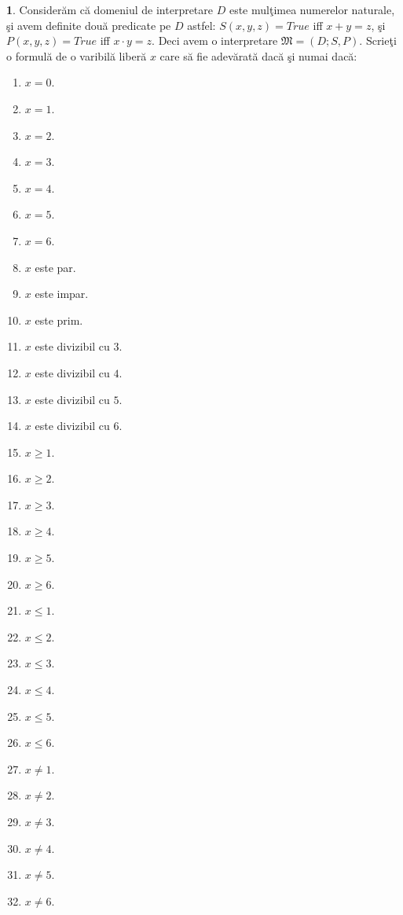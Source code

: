 \documentclass{article}
\begin{document}
{\bf 1}. Consider\u{a}m c\u{a} domeniul de interpretare $D$ este mul\c{t}imea numerelor naturale, \c{s}i avem definite dou\u{a} predicate pe $D$ astfel: 
$S(x,y,z)=True$ iff $x+y=z$, \c{s}i $P(x,y,z)=True$ iff $x\cdot{y}=z$. Deci avem o interpretare $\mathfrak{M}=(D;S,P)$. Scrie\c{t}i o formul\u{a} de o varibil\u{a} liber\u{a} $x$ care s\u{a} fie adev\u{a}rat\u{a} dac\u{a} \c{s}i numai dac\u{a}:
\begin{enumerate}
	\item $x=0$.
	\item $x=1$.
	\item $x=2$.
	\item $x=3$.
	\item $x=4$.
	\item $x=5$.
	\item $x=6$.
	\item $x$ este par.
	\item $x$ este impar.
	\item $x$ este prim.
	\item $x$ este divizibil cu $3$.
	\item $x$ este divizibil cu $4$.
        \item $x$ este divizibil cu $5$.
        \item $x$ este divizibil cu $6$.
        \item $x\ge 1$.
        \item $x\ge 2$.
        \item $x\ge 3$.
        \item $x\ge 4$.
        \item $x\ge 5$.
        \item $x\ge 6$.
        \item $x\le 1$.
        \item $x\le 2$.
        \item $x\le 3$.
        \item $x\le 4$.
        \item $x\le 5$.
        \item $x\le 6$.
        \item $x\ne 1$.
        \item $x\ne 2$.
        \item $x\ne 3$.
        \item $x\ne 4$.
        \item $x\ne 5$.
        \item $x\ne 6$.
\end{enumerate}

\bigskip
\end{document}
